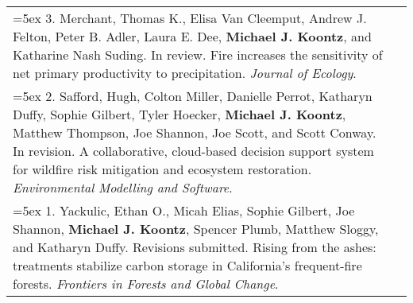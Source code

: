 \begin{longtable}{@{} >{\raggedright}p{6.10in} >{\raggedleft}X @{}}

\hangindent=5ex 3. Merchant, Thomas K., Elisa Van Cleemput, Andrew J. Felton, Peter B. Adler, Laura E. Dee, \textbf{Michael J. Koontz}, and Katharine Nash Suding. In review. Fire increases the sensitivity of net primary productivity to precipitation. \emph{Journal of Ecology}. & \tabularnewline

\hangindent=5ex 2. Safford, Hugh, Colton Miller, Danielle Perrot, Katharyn Duffy, Sophie Gilbert, Tyler Hoecker, \textbf{Michael J. Koontz}, Matthew Thompson, Joe Shannon, Joe Scott, and Scott Conway. In revision. A collaborative, cloud-based decision support system for wildfire risk mitigation and ecosystem restoration. \emph{Environmental Modelling and Software}. & \tabularnewline

\hangindent=5ex 1. Yackulic, Ethan O., Micah Elias, Sophie Gilbert, Joe Shannon, \textbf{Michael J. Koontz}, Spencer Plumb, Matthew Sloggy, and Katharyn Duffy. Revisions submitted. Rising from the ashes: treatments stabilize carbon storage in California's frequent-fire forests. \emph{Frontiers in Forests and Global Change}. & \tabularnewline

\end{longtable}

